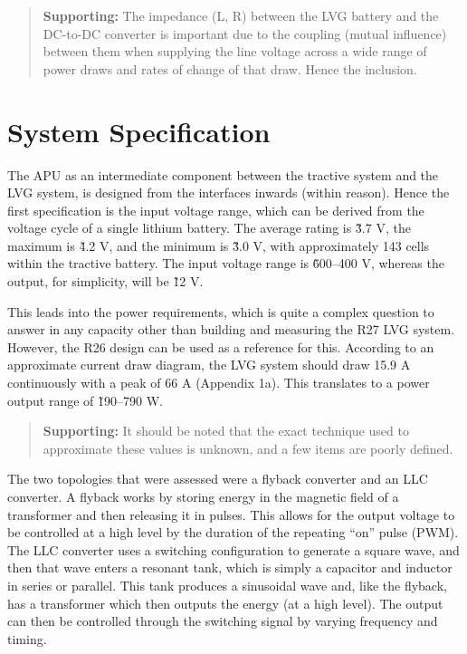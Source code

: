 \documentclass[12pt,a4paper]{article}
\begin{document}
\vspace{0.5cm}

\begin{quote}
  \textbf{Supporting:}
    The impedance (L, R) between the LVG battery and the DC-to-DC converter is important due to the coupling (mutual influence) between them when supplying the 
    line voltage across a wide range of power draws and rates of change of that draw. Hence the inclusion.
\end{quote}

\newpage

\section{System Specification}

The APU as an intermediate component between the tractive system and the LVG system, is designed from the interfaces inwards (within reason). Hence the first specification 
is the input voltage range, which can be derived from the voltage cycle of a single lithium battery. The average rating is \~3.7 V, the maximum is \~4.2 V, and the minimum is \~3.0 V, with 
approximately 143 cells within the tractive battery. The input voltage range is \~600--400 V, whereas the output, for simplicity, will be \~12 V.

\vspace{0.5cm}

This leads into the power requirements, which is quite a complex question to answer in any capacity other than building and measuring the R27 LVG system. However, the R26 design can be used as a 
reference for this. According to an approximate current draw diagram, the LVG system should draw 15.9 A continuously with a peak of 66 A (Appendix 1a). This translates to a power output range of 
\~190--790 W.

\begin{quote}
  \textbf{Supporting:} 
  It should be noted that the exact technique used to approximate these values is unknown, and a few items are poorly defined.
\end{quote}

The two topologies that were assessed were a flyback converter and an LLC converter. A flyback works by storing energy in the magnetic field of a transformer and then releasing it in pulses. This allows 
for the output voltage to be controlled at a high level by the duration of the repeating ``on'' pulse (PWM). The LLC converter uses a switching configuration to generate a square wave, and then that wave enters 
a resonant tank, which is simply a capacitor and inductor in series or parallel. This tank produces a sinusoidal wave and, like the flyback, has a transformer which then outputs the energy (at a high level). 
The output can then be controlled through the switching signal by varying frequency and timing.
\end{document}
